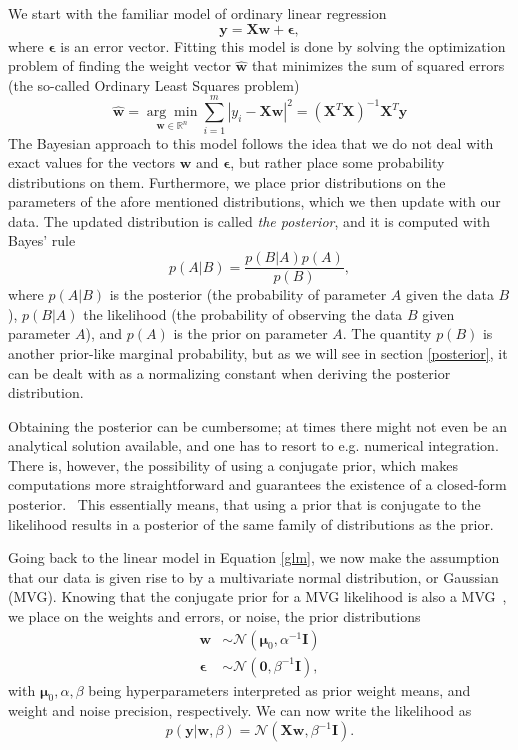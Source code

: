 \documentclass[english, 12pt, a4paper, sci, utf8, a-2b, online]{aaltothesis}
\begin{document}
We start with the familiar model of ordinary linear regression
%
\begin{equation} \label{glm}
  \bm{y} = \mathbf{X}\bm{w} + \bm{\epsilon},
\end{equation}
%
where $\bm{\epsilon}$ is an error vector. Fitting this model is done by solving the optimization problem of finding the weight vector $\hat{\bm{w}}$ that minimizes the sum of squared errors
(the so-called Ordinary Least Squares problem)
%
\begin{equation}
  \hat{\bm{w}} = \underset{\bm{w} \in \mathbb{R}^n}{\arg \min} \sum_{i=1}^m |y_i - \mathbf{X}\bm{w}|^2 = (\mathbf{X}^T\mathbf{X})^{-1}\mathbf{X}^T\bm{y}
\end{equation}
%
The Bayesian approach to this model follows the idea that we do not deal with exact values for the vectors $\bm{w}$ and $\bm{\epsilon}$, but rather place some probability distributions on them.
Furthermore, we place prior distributions on the parameters of the afore mentioned distributions, which we then update with our data. The updated distribution is called \textit{the posterior}, and
it is computed with Bayes' rule
%
\begin{equation} \label{bayes}
  p(A|B) = \frac{p(B|A)p(A)}{p(B)},
\end{equation}
%
where $p(A|B)$ is the posterior (the probability of parameter $A$ given the data $B$), $p(B|A)$ the likelihood (the probability of observing the data $B$ given parameter $A$), and $p(A)$ is the
prior on parameter $A$. The quantity $p(B)$ is another prior-like marginal probability, but as we will see in section \ref{posterior}, it can be dealt with as a normalizing constant when deriving
the posterior distribution.

Obtaining the posterior can be cumbersome; at times there might not even be an analytical solution available, and one has to resort to e.g. numerical integration. There is, however, the possibility
of using a conjugate prior, which makes computations more straightforward and guarantees the existence of a closed-form posterior.~\cite{raiffa} This essentially means, that using a prior that is
conjugate to the likelihood results in a posterior of the same family of distributions as the prior.

Going back to the linear model in Equation \eqref{glm}, we now make the assumption that our data is given rise to by a multivariate normal distribution, or Gaussian (MVG). Knowing that the conjugate
prior for a MVG likelihood is also a MVG~\cite{murphy}, we place on the weights and errors, or noise, the prior distributions
%
\begin{align}
  \bm{w}        & \sim \mathcal{N}(\bm{\mu}_0,\alpha^{-1}\mathbf{I}) \label{wprior} \\
  \bm{\epsilon} & \sim \mathcal{N}(\bm{0},\beta^{-1}\mathbf{I}), \label{eprior}
\end{align}
%
with $\bm{\mu}_0, \alpha, \beta$ being hyperparameters interpreted as prior weight means, and weight and noise precision, respectively. We can now write the likelihood as
%
\begin{equation}\label{likel}
  p(\bm{y}|\bm{w},\beta) = \mathcal{N}(\mathbf{X}\bm{w}, \beta^{-1}\mathbf{I}).
\end{equation}
\end{document}
